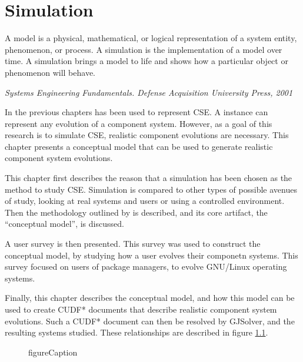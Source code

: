 \chapter{Simulation}
\label{simulation}
\epigraph{A model is a physical, mathematical, or logical representation of a system entity, phenomenon, or process. 
A simulation is the implementation of a model over time. 
A simulation brings a model to life and shows how a particular object or phenomenon will behave.}
{\textit{Systems Engineering Fundamentals. Defense Acquisition University Press, 2001}}

In the previous chapters \modelname has been used to represent CSE.
A \modelname instance can represent any evolution of a component system.
However, as a goal of this research is to simulate CSE, realistic component evolutions are necessary.
This chapter presents a conceptual model that can be used to generate realistic component system evolutions.

This chapter first describes the reason that a simulation has been chosen as the method to study CSE.
Simulation is compared to other types of possible avenues of study, looking at real systems and users or using a controlled environment.
Then the methodology outlined by \cite{Law2005} is described, 
and its core artifact, the ``conceptual model'', is discussed.

A user survey is then presented.
This survey was used to construct the conceptual model, by studying how a user evolves their componetn systems.
This survey focused on users of package managers, to evolve GNU/Linux operating systems.

Finally, this chapter describes the conceptual model, and how this model can be used to create CUDF* documents that describe realistic component system evolutions. 
Such a CUDF* document can then be resolved by GJSolver, and the resulting systems studied.
These relationships are described in figure \ref{sim.modeldiagram}.

\begin{figure}[htp]
\begin{center}
  \caption[labelInTOC]{figureCaption}
  \label{sim.modeldiagram}
\end{center}
\end{figure}


